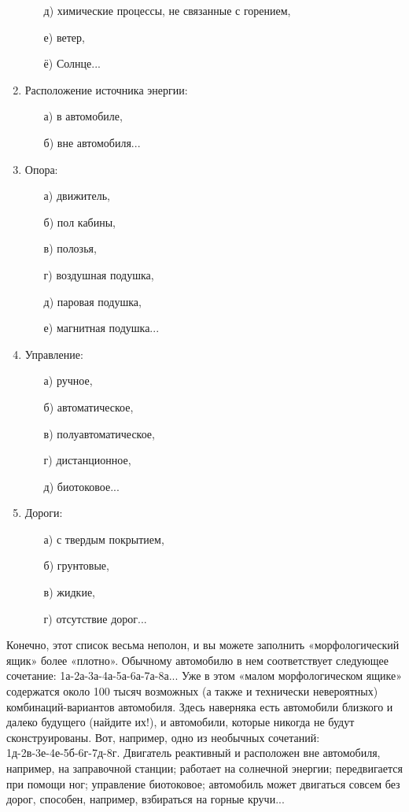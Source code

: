 \documentclass[11pt,a4paper]{article}
\begin{document}
\begin{enumerate}[noitemsep]
\begin{itemize}[noitemsep]
  \item[д)] химические процессы, не связанные с горением,
  \item[е)] ветер,
  \item[ё)] Солнце...
  \end{itemize}
\item Расположение источника энергии: 
  \begin{itemize}[noitemsep]
  \item[а)] в автомобиле,
  \item[б)] вне автомобиля...
  \end{itemize}
\item Опора:  
  \begin{itemize}[noitemsep]
  \item[а)] движитель,
  \item[б)] пол кабины,
  \item[в)] полозья,
  \item[г)] воздушная подушка,
  \item[д)] паровая подушка,
  \item[е)] магнитная подушка...
  \end{itemize}
\item Управление: 
  \begin{itemize}[noitemsep]
  \item[а)] ручное,
  \item[б)] автоматическое,
  \item[в)] полуавтоматическое,
  \item[г)] дистанционное,
  \item[д)] биотоковое...
  \end{itemize}
\item Дороги: 
  \begin{itemize}[noitemsep]
  \item[а)] с твердым покрытием,
  \item[б)] грунтовые,
  \item[в)] жидкие,
  \item[г)] отсутствие дорог...
  \end{itemize}
\end{enumerate}
Конечно, этот список весьма неполон, и вы можете заполнить «морфологический
ящик» более «плотно». Обычному автомобилю в нем соответствует следующее
сочетание: 1а-2а-3а-4а-5а-6а-7а-8а... Уже в этом «малом морфологическом ящике»
содержатся около 100 тысяч возможных (а также и технически невероятных)
комбинаций-вариантов автомобиля. Здесь наверняка есть автомобили близкого и
далеко будущего (найдите их!), и автомобили, которые никогда не будут
сконструированы. Вот, например, одно из необычных сочетаний:
1д-2в-3е-4е-5б-6г-7д-8г.  Двигатель реактивный и расположен вне автомобиля,
например, на заправочной станции; работает на солнечной энергии; передвигается
при помощи ног; управление биотоковое; автомобиль может двигаться совсем без
дорог, способен, например, взбираться на горные кручи...
\end{document}
